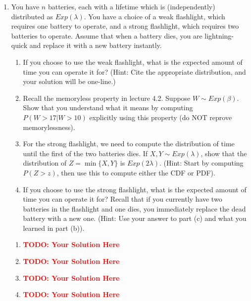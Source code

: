 \documentclass[12pt]{article}
\def\todo#1{\textcolor{red}{\textbf{#1}}}
\renewcommand{\|}{\mid}
\begin{document}
\begin{enumerate}
\item You have $n$ batteries, each with a lifetime which is (independently) distributed as $Exp(\lambda)$. You have a choice of a weak flashlight, which requires one battery to operate, and a strong flashlight, which requires two batteries to operate. Assume that when a battery dies, you are lightning-quick and replace it with a new battery instantly.
\begin{enumerate}
    \item If you choose to use the weak flashlight, what is the expected amount of time you can operate it for? (Hint: Cite the appropriate distribution, and your solution will be one-line.)
    \item Recall the memoryless property in lecture 4.2. Suppose $W\sim Exp(\beta)$. Show that you understand what it means by computing $P(W>17|W>10)$ explicitly using this property (do NOT reprove memorylessness).
    \item For the strong flashlight, we need to compute the distribution of time until the first of the two batteries dies. If $X,Y\sim Exp(\lambda)$, show that the distribution of $Z=\min\{X,Y\}$ is $Exp(2\lambda)$. (Hint: Start by computing $P(Z>z)$, then use this to compute either the CDF or PDF).
    \item If you choose to use the strong flashlight, what is the expected amount of time you can operate it for? Recall that if you currently have two batteries in the flashlight and one dies, you immediately replace the dead battery with a new one. (Hint: Use your answer to part (c) and what you learned in part (b)).
\end{enumerate}

\begin{tcolorbox}
\begin{enumerate}
\item \todo{TODO: Your Solution Here}
\item \todo{TODO: Your Solution Here}
\item \todo{TODO: Your Solution Here}
\item \todo{TODO: Your Solution Here}
\end{enumerate}
\end{tcolorbox}


\end{enumerate}
\end{document}
